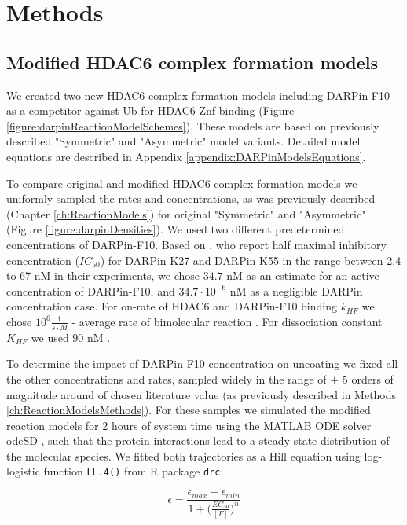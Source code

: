 \section{Methods}
\label{ch:DARPinMethods}

\subsection{Modified HDAC6 complex formation models}

We created two new HDAC6 complex formation models including DARPin-F10 as a competitor against Ub for HDAC6-Znf binding (Figure \ref{figure:darpinReactionModelSchemes}). These models are based on previously described "Symmetric" and "Asymmetric" model variants. Detailed model equations are described in Appendix \ref{appendix:DARPinModelsEquations}.

To compare original and modified HDAC6 complex formation models we uniformly sampled the rates and concentrations, as was previously described (Chapter \ref{ch:ReactionModels}) for original "Symmetric" and "Asymmetric" (Figure \ref{figure:darpinDensities}). We used two different predetermined concentrations of DARPin-F10. Based on \cite{guillard2017structural}, who report half maximal inhibitory concentration ($IC_{50}$) for DARPin-K27 and DARPin-K55 in the range between 2.4 to 67 nM in their experiments, we chose $34.7$ nM as an estimate for an active concentration of DARPin-F10, and  $34.7 \cdot 10^{-6}$ nM as a negligible DARPin concentration case. For on-rate of HDAC6 and DARPin-F10 binding $k_{HF}$ we chose $10^{6} \frac{1}{s\cdot M}$ - average rate of bimolecular reaction \cite{bionumbersbimolrate}. For dissociation constant $K_{HF}$ we used $90$ nM \cite{DarpinData}.

To determine the impact of DARPin-F10 concentration on uncoating we fixed all the other concentrations and rates, sampled widely in the range of $\pm$ 5 orders of magnitude around of chosen literature value (as previously described in Methods \ref{ch:ReactionModelsMethods}). For these samples we simulated the modified reaction models for 2 hours of system time using the MATLAB ODE solver odeSD \cite{gonnet2012specialized}, such that the protein interactions lead to a steady-state distribution of the molecular species. We fitted both trajectories as a Hill equation using log-logistic function \texttt{LL.4()} from R package \texttt{drc}:

\begin{equation}
\epsilon=\frac{\epsilon_{max} - \epsilon_{min}}{1 + \big(\frac{EC_{50}}{[F]}\big)^n}
\end{equation}

